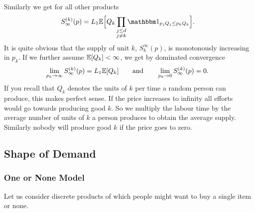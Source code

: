 Similarly we get for all other products
\[
	S_\infty^{(k)}(p)
	= L_1 \E\Bigl[
		Q_k \prod_{\substack{j\le\dims\\j\neq k}}\ind_{p_jQ_j\le p_k Q_k}
	\Bigr].
\]
It is quite obvious that the supply of unit \(k\), \(S^\infty_k(p)\), is
monotonously increasing in \(p_k\).  If we further assume \(\mathbb{E}[Q_k]<\infty\), we
get by dominated convergence
\[
	\lim_{p_k\to \infty}S_\infty^{(k)}(p) = L_1\mathbb{E}[Q_k]
	\qquad\text{and}\qquad
	\lim_{p_k\to 0}S_\infty^{(k)}(p) = 0.
\]
If you recall that \(Q_k\) denotes the units of \(k\) per time a random
person can produce, this makes perfect sense. If the price increases to infinity
all efforts would go towards producing good \(k\). So we multiply the labour
time by the average number of units of \(k\) a person produces to obtain the
average supply. Similarly nobody will produce good \(k\) if the price goes to
zero.

\subsection{Shape of Demand}

\subsubsection{One or None Model}

Let us consider discrete products of which people might want to buy a single
item or none.

